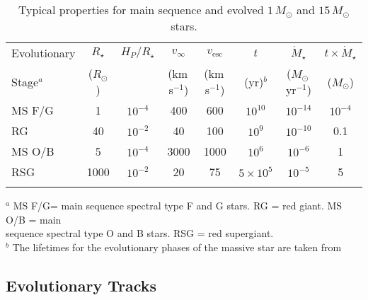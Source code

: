 \begin{table}[!hbt]
\begin{center}
\caption[Properties of Main Sequence and Evolved Stars]
{Typical properties for main sequence and evolved $1\,M_{\odot}$ and $15\,M_{\odot}$ stars.}
\begin{tabular}{lccccccc}
\hline
\hline
\rule{0pt}{2.5ex}Evolutionary & $R_{\star}$ & $H_{P}/R_{\star}$ & $v_{\infty}$ & $v_{\mathrm{esc}}$ &$t$ & $\dot{M}_{\star}$& $t \times \dot{M}_{\star}$\\
 Stage$^{a}$ & ($R_{\odot}$) &  & (km\,s$^{-1}$) & (km\,s$^{-1}$) & (yr)$^{b}$  & ($M_{\odot}$\,yr$^{-1}$)& ($M_{\odot}$) \\
\hline
\rule{0pt}{2.5ex}MS F/G & 1 &$10^{-4}$ & 400& 600& $10^{10}$ &$10^{-14}$ &$10^{-4}$\\ 
RG & 40 & $10^{-2}$& 40& 100& $10^{9}$ & $10^{-10}$&0.1\\ 
\hline
\rule{0pt}{2.5ex}MS O/B &5 &  $10^{-4}$ & 3000 & 1000&$10^{6}$ & $10^{-6}$&1\\
RSG & 1000 & $10^{-2}$& 20 & 75& $5\times10^{5}$&$10^{-5}$ &5\\ 
\hline
\hline
\rule{0pt}{2.0ex}
\end{tabular}
\label{tab:1.1}
\begin{minipage}{19.5cm}
{\footnotesize \vspace{-0.4cm} $^{a}$ MS F/G= main sequence spectral type F and G stars. RG = red giant. MS O/B = main\\ sequence spectral type O and B stars. RSG = red supergiant.\\
\footnotesize  $^{b}$ The lifetimes for the evolutionary phases of the massive star are taken from \\ \cite{stothers_1969}}
\end{minipage}
\end{center}
\end{table}
\vspace{-0.5cm}

\subsection{Evolutionary Tracks}\label{sec:1.5.2}

